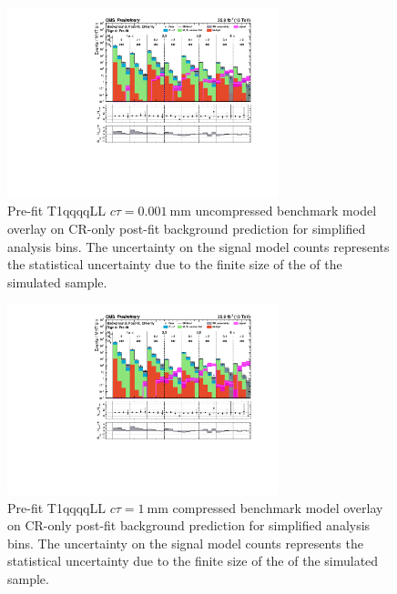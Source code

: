 \begin{figure}[h!]
    \begin{center}
        \includegraphics[width=0.7\textwidth]{figures/susyLLResults/app/T1qqqqLL_ctau_0p001_mGluino-1800_mLSP-200/all_full-fit-sig}
        \caption{
            Pre-fit T1qqqqLL $c\tau=0.001~\mathrm{mm}$ uncompressed benchmark
            model overlay on CR-only post-fit background prediction for
            simplified analysis bins. The uncertainty on the signal model counts
            represents the statistical uncertainty due to the finite size of the
            of the simulated sample.
        }
        \label{fig:T1qqqqLL_ctau_0p001_uncompressed_MR_simp}
    \end{center}
\end{figure}

\begin{figure}[h!]
    \begin{center}
        \includegraphics[width=0.7\textwidth]{figures/susyLLResults/app/T1qqqqLL_ctau_1_mGluino-1800_mLSP-200/all_full-fit-sig}
        \caption{
            Pre-fit T1qqqqLL $c\tau=1~\mathrm{mm}$ compressed benchmark
            model overlay on CR-only post-fit background prediction for
            simplified analysis bins. The uncertainty on the signal model counts
            represents the statistical uncertainty due to the finite size of the
            of the simulated sample.
        }
        \label{fig:T1qqqqLL_ctau_1_compressed_MR_simp}
    \end{center}
\end{figure}

